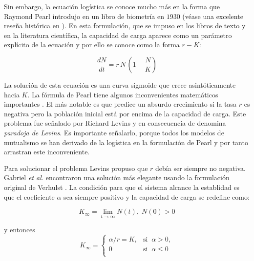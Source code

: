 Sin embargo, la ecuación logística se conoce mucho más en la forma que Raymond Pearl introdujo en un libro de biometría en $1930$ (véase una excelente reseña histórica en \cite{mallet2012struggle}). En esta formulación, que se impuso en los libros de texto y en la literatura científica, la capacidad de carga aparece como un parámetro explícito de la ecuación y por ello se conoce como la forma $r-K$:

\begin{equation}
\frac{dN}{dt}=r \, N \, \left(1-\frac{N}{K}\right)
\label{pearl}
\end{equation}

La solución de esta ecuación es una curva sigmoide que crece asintóticamente hacia $K$. La fórmula de Pearl tiene algunos inconvenientes matemáticos importantes \citep{kuno1991some,gabriel2005paradoxes}. El más notable es que predice un absurdo crecimiento si la tasa $r$ es negativa pero la población inicial está por encima de la capacidad de carga. Este problema fue señalado por Richard Levins y en consecuencia de denomina \textit{paradoja de Levins}. Es importante señalarlo, porque todos los modelos de mutualismo se han derivado de la logística en la formulación de Pearl y por tanto arrastran este inconveniente.

Para solucionar el problema Levins propuso que $r$ debía ser siempre no negativa. Gabriel \emph{et al.} encontraron una solución más elegante usando la formulación original de Verhulst \cite{gabriel2005paradoxes}. La condición para que el sistema alcance la establidad es que el coeficiente $\alpha$ sea siempre positivo y la capacidad de carga se redefine como:

\begin{equation}
K_{\infty}=\lim_{t\rightarrow\infty}N(t),\; N(0)>0
\end{equation}

\noindent y entonces
\begin{equation*}
K_{\infty}=\left\{
\begin{array}{ll}
  \alpha / r = K, & \mathrm{si} \;\; \alpha > 0, \\ 0  & \mathrm{si} \;\; \alpha \le0 \\
  \end{array} \right.
\end{equation*}

